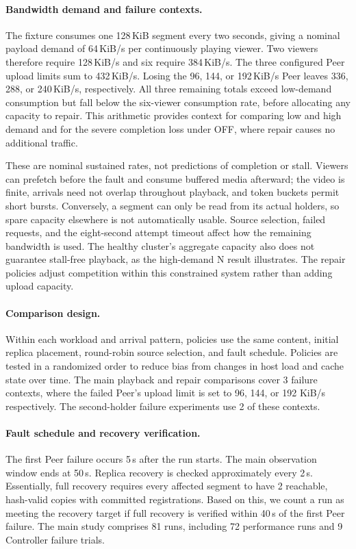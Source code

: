 \paragraph{Bandwidth demand and failure contexts.}
The fixture consumes one 128\,KiB segment every two seconds, giving a
nominal payload demand of 64\,KiB/s per continuously playing viewer.
Two viewers therefore require 128\,KiB/s and six require 384\,KiB/s.
The three configured Peer upload limits sum to 432\,KiB/s. Losing the
96, 144, or 192\,KiB/s Peer leaves 336, 288, or 240\,KiB/s, respectively.
All three remaining totals exceed low-demand consumption but fall below
the six-viewer consumption rate, before allocating any capacity to repair.
This arithmetic provides context for comparing low and high demand and
for the severe completion loss under OFF, where repair causes no additional
traffic.

These are nominal sustained rates, not predictions of completion or stall.
Viewers can prefetch before the fault and consume buffered media afterward;
the video is finite, arrivals need not overlap throughout playback, and
token buckets permit short bursts. Conversely, a segment can only be read
from its actual holders, so spare capacity elsewhere is not automatically
usable. Source selection, failed requests, and the eight-second attempt
timeout affect how the remaining bandwidth is used. The healthy cluster's
aggregate capacity also does not guarantee stall-free playback, as the
high-demand N result illustrates. The repair policies adjust competition
within this constrained system rather than adding upload capacity.

\paragraph{Comparison design.}
Within each workload and arrival pattern, 
policies use the same content, initial replica placement, round-robin source selection, and fault schedule.
Policies are tested in a randomized order to reduce bias from changes in host load and cache state over time.
The main playback and repair comparisons cover 3 failure contexts, 
where the failed Peer's upload limit is set to 96, 144, or 192 KiB/s respectively.
The second-holder failure experiments use 2 of these contexts.

\paragraph{Fault schedule and recovery verification.}
The first Peer failure occurs 5\,s after the run starts.
The main observation window ends at 50\,s.
Replica recovery is checked approximately every 2\,s.
Essentially, full recovery requires every affected segment to have 2 reachable,
hash-valid copies with committed registrations.
Based on this, we count a run as meeting the recovery target if full recovery is verified within 40\,s of the first Peer failure.
The main study comprises 81 runs, including 72 performance runs and 9 Controller failure trials.

